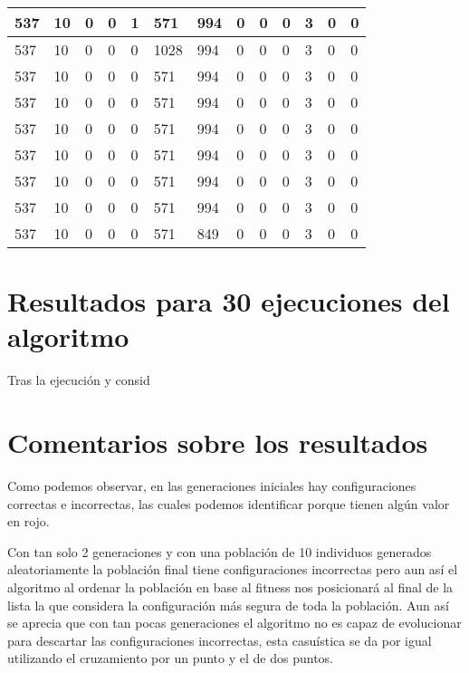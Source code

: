 \begin{table}[H]
\begin{tabular}{|l|l|l|l|l|l|l|l|l|l|l|l|l|}
537  &  10  &  0  &  0  &  1  &  571  &  994  &  0  &  0  &  0  &  3  &  0  &  0 \\ \hline
537  &  10  &  0  &  0  &  0  &  1028  &  994  &  0  &  0  &  0  &  3  &  0  &  0 \\ \hline
537  &  10  &  0  &  0  &  0  &  571  &  994  &  0  &  0  &  0  &  3  &  0  &  0 \\ \hline
537  &  10  &  0  &  0  &  0  &  571  &  994  &  0  &  0  &  0  &  3  &  0  &  0 \\ \hline
537  &  10  &  0  &  0  &  0  &  571  &  994  &  0  &  0  &  0  &  3  &  0  &  0 \\ \hline
537  &  10  &  0  &  0  &  0  &  571  &  994  &  0  &  0  &  0  &  3  &  0  &  0 \\ \hline
537  &  10  &  0  &  0  &  0  &  571  &  994  &  0  &  0  &  0  &  3  &  0  &  0 \\ \hline
537  &  10  &  0  &  0  &  0  &  571  &  994  &  0  &  0  &  0  &  3  &  0  &  0 \\ \hline
537  &  10  &  0  &  0  &  0  &  571  &  849  &  0  &  0  &  0  &  3  &  0  &  0 \\ \hline
\end{tabular}
\end{table}

\section{Resultados para 30 ejecuciones del algoritmo}

Tras la ejecución y consid

\section{Comentarios sobre los resultados}

Como podemos observar, en las generaciones iniciales hay configuraciones correctas e incorrectas, las cuales podemos identificar porque tienen algún valor en rojo. 

\bigskip
Con tan solo 2 generaciones y con una población de 10 individuos generados aleatoriamente la población final tiene configuraciones incorrectas pero aun así el algoritmo al ordenar la población en base al fitness nos posicionará al final de la lista la que considera la configuración más segura de toda la población. Aun así se aprecia que con tan pocas generaciones el algoritmo no es capaz de evolucionar para descartar las configuraciones incorrectas, esta casuística se da por igual utilizando el cruzamiento por un punto y el de dos puntos.

